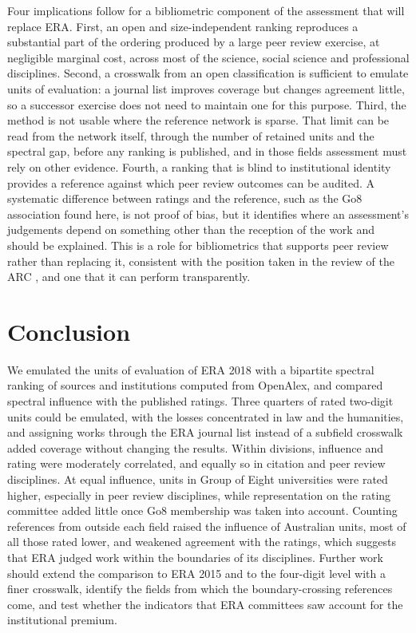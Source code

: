 Four implications follow for a bibliometric component of the assessment that will replace ERA. First, an open and size-independent ranking reproduces a substantial part of the ordering produced by a large peer review exercise, at negligible marginal cost, across most of the science, social science and professional disciplines. Second, a crosswalk from an open classification is sufficient to emulate units of evaluation: a journal list improves coverage but changes agreement little, so a successor exercise does not need to maintain one for this purpose. Third, the method is not usable where the reference network is sparse. That limit can be read from the network itself, through the number of retained units and the spectral gap, before any ranking is published, and in those fields assessment must rely on other evidence. Fourth, a ranking that is blind to institutional identity provides a reference against which peer review outcomes can be audited. A systematic difference between ratings and the reference, such as the Go8 association found here, is not proof of bias, but it identifies where an assessment's judgements depend on something other than the reception of the work and should be explained. This is a role for bibliometrics that supports peer review rather than replacing it, consistent with the position taken in the review of the ARC \citep{sheil2023trusting}, and one that it can perform transparently.

\section{Conclusion}

We emulated the units of evaluation of ERA 2018 with a bipartite spectral ranking of sources and institutions computed from OpenAlex, and compared spectral influence with the published ratings. Three quarters of rated two-digit units could be emulated, with the losses concentrated in law and the humanities, and assigning works through the ERA journal list instead of a subfield crosswalk added coverage without changing the results. Within divisions, influence and rating were moderately correlated, and equally so in citation and peer review disciplines. At equal influence, units in Group of Eight universities were rated higher, especially in peer review disciplines, while representation on the rating committee added little once Go8 membership was taken into account. Counting references from outside each field raised the influence of Australian units, most of all those rated lower, and weakened agreement with the ratings, which suggests that ERA judged work within the boundaries of its disciplines. Further work should extend the comparison to ERA 2015 and to the four-digit level with a finer crosswalk, identify the fields from which the boundary-crossing references come, and test whether the indicators that ERA committees saw account for the institutional premium.
